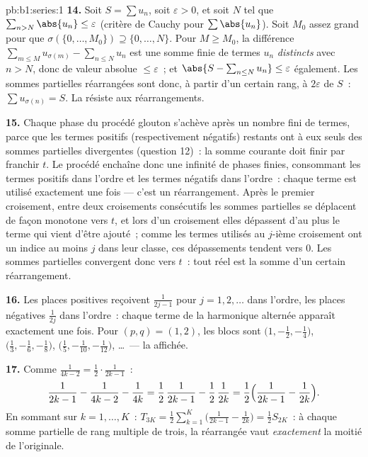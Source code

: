 \begin{solution}{pb:b1:series:1}
\textbf{14.} Soit $S = \sum u_n$, soit $\varepsilon > 0$, et soit $N$
tel que $\sum_{n > N} \abs{u_n} \leq \varepsilon$ (critère de Cauchy
pour $\sum\abs{u_n}$). Soit $M_0$ assez grand pour que $\sigma(\{0,
\dots, M_0\}) \supseteq \{0, \dots, N\}$. Pour $M \geq M_0$, la
différence $\sum_{m \leq M} u_{\sigma(m)} - \sum_{n \leq N} u_n$
est une somme finie de termes $u_n$ \emph{distincts} avec $n > N$,
donc de valeur absolue $\leq \varepsilon$~; et $\abs{S -
\sum_{n\leq N} u_n} \leq \varepsilon$ également. Les sommes
partielles réarrangées sont donc, à partir d'un certain rang, à
$2\varepsilon$ de $S$~: $\sum u_{\sigma(n)} = S$. La  résiste aux réarrangements.

\textbf{15.} Chaque phase du procédé glouton s'achève après un nombre
fini de termes, parce que les termes positifs (respectivement
négatifs) restants ont à eux seuls des sommes partielles divergentes
(question 12)~: la somme courante doit finir par franchir $t$. Le
procédé enchaîne donc une infinité de phases finies, consommant les
termes positifs dans l'ordre et les termes négatifs dans l'ordre~:
chaque terme est utilisé exactement une fois --- c'est un
réarrangement. Après le premier croisement, entre deux croisements
consécutifs les sommes partielles se déplacent de façon monotone vers
$t$, et lors d'un croisement elles dépassent d'au plus le terme qui
vient d'être ajouté~; comme les termes utilisés au $j$-ième
croisement ont un indice au moins $j$ dans leur classe, ces
dépassements tendent vers $0$. Les sommes partielles convergent donc
vers $t$~: tout réel est la somme d'un certain réarrangement.

\textbf{16.} Les places positives reçoivent $\frac{1}{2j-1}$ pour
$j = 1, 2, \dots$ dans l'ordre, les places négatives $\frac{1}{2j}$
dans l'ordre~: chaque terme de la  harmonique alternée apparaît
exactement une fois. Pour $(p, q) = (1, 2)$, les blocs sont
$\bigl(1, -\frac12, -\frac14\bigr)$, $\bigl(\frac13, -\frac16,
-\frac18\bigr)$, $\bigl(\frac15, -\frac1{10},
-\frac1{12}\bigr)$, \dots\ --- la  affichée.

\textbf{17.} Comme $\frac{1}{4k-2} = \frac12\cdot\frac{1}{2k-1}$~:
\[
\frac{1}{2k-1} - \frac{1}{4k-2} - \frac{1}{4k}
= \frac12\,\frac{1}{2k-1} - \frac12\,\frac{1}{2k}
= \frac12\Bigl(\frac{1}{2k-1} - \frac{1}{2k}\Bigr).
\]
En sommant sur $k = 1, \dots, K$~: $T_{3K} = \frac12
\sum_{k=1}^{K}\bigl(\frac{1}{2k-1} - \frac{1}{2k}\bigr) =
\frac12 S_{2K}$~: à chaque somme partielle de rang multiple de trois,
la  réarrangée vaut \emph{exactement} la moitié de l'originale.


\end{solution}
